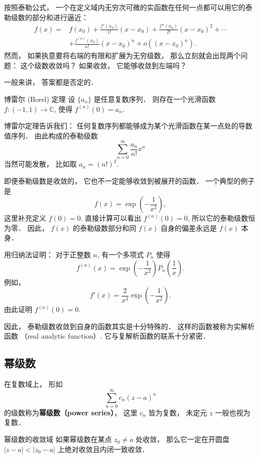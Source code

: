 

按照泰勒公式， 一个在定义域内无穷次可微的实函数在任何一点都可以用它的泰勒级数的部分和进行逼近：
$$
\begin{aligned}
f(x)=&f(x_0)+\frac{f'(x_0)}{1!}(x-x_0)+\frac{f''(x_0)}{2!}(x-x_0)^2+\cdots\\
&+\frac{f^{(n)}(x_0)}{n!}(x-x_0)^n+o((x-x_0)^n).
\end{aligned}
$$
然而， 如果执意要将右端的有限和扩展为无穷级数， 那么立刻就会出现两个问题： 这个级数收敛吗？ 如果收敛， 它能够收敛到左端吗？

一般来讲， 答案都是否定的． 

\begin{theorem}{博雷尔 (Borel) 定理}
设 $\{a_n\}$ 是任意复数序列． 则存在一个光滑函数 $f:(-1,1)\to\mathbb{C}$, 使得 $f^{(n)}(0)=a_n$.
\end{theorem}
博雷尔定理告诉我们： 任何复数序列都能够成为某个光滑函数在某一点处的导数值序列． 由此构成的泰勒级数
$$
\sum_{n=0}^\infty\frac{a_n}{n!}x^n
$$
当然可能发散， 比如取 $a_n=(n!)^2$.

即便泰勒级数是收敛的， 它也不一定能够收敛到被展开的函数． 一个典型的例子是
$$
f(x)=\exp\left(-\frac{1}{x^2}\right),
$$
这里补充定义 $f(0)=0$. 直接计算可以看出 $f^{(n)}(0)=0$, 所以它的泰勒级数恒为零． 因此， $f(x)$ 的泰勒级数部分和同 $f(x)$ 自身的偏差永远是 $f(x)$ 本身．

\begin{exercise}{}
用归纳法证明： 对于正整数 $n$, 有一个多项式 $P_n$ 使得
$$
f^{(n)}(x)=\exp\left(-\frac{1}{x^2}\right)P_n\left(\frac{1}{x}\right).
$$
例如， 
$$
f'(x)=\frac{2}{x^3}\exp\left(-\frac{1}{x^2}\right).
$$
由此证明 $f^{(n)}(0)=0$.
\end{exercise}

因此， 泰勒级数收敛到自身的函数其实是十分特殊的． 这样的函数被称为实解析函数 （real analytic function）. 它与复解析函数的联系十分紧密．

\subsection{幂级数}
在复数域上， 形如
\begin{equation}
\sum_{n=0}^\infty c_n(z-a)^n
\end{equation}
的级数称为\textbf{幂级数（power series）}， 这里 $c_n$ 皆为复数， 未定元 $z$ 一般也视为复数． 

\begin{theorem}{幂级数的收敛域}
如果幂级数在某点 $z_0\neq a$ 处收敛， 那么它一定在开圆盘 $|z-a|<|z_0-a|$ 上绝对收敛且内闭一致收敛．
\end{theorem}

